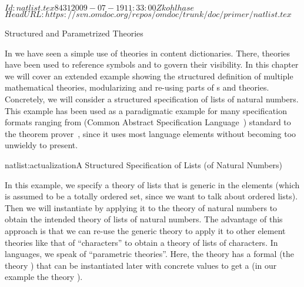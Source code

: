 \svnInfo $Id: natlist.tex 8431 2009-07-19 11:33:00Z kohlhase $
\svnKeyword $HeadURL: https://svn.omdoc.org/repos/omdoc/trunk/doc/primer/natlist.tex $

\begin{omgroup}[id=natlist]{Structured and Parametrized Theories}

In {} we have seen a simple use of theories in {\openmath} content
dictionaries. There, theories have been used to reference {\openmath} symbols and to
govern their visibility. In this chapter we will cover an extended example showing the
structured definition of multiple mathematical theories, modularizing and re-using parts
of {s} and theories.  Concretely, we will consider a
structured specification of lists of natural numbers. This example has been used as a
paradigmatic example for many specification formats ranging from {\casl} (Common Abstract
Specification Language~\cite{CoFI:2004:CASL-RM}) standard to the {\pvs} theorem prover~\cite{OwRu92},
since it uses most language elements without becoming too unwieldy to present.

\begin{myfig}{natlist:actualization}{A Structured Specification of Lists (of
    Natural Numbers)}
\end{myfig}

In this example, we specify a theory {} of lists that is generic in the
elements (which is assumed to be a totally ordered set, since we want to talk about
ordered lists).  Then we will instantiate {} by applying it to the theory
{} of natural numbers to obtain the intended theory {}
of lists of natural numbers.  The advantage of this approach is that we can re-use the
generic theory {} to apply it to other element theories like that of
``characters'' to obtain a theory of lists of characters.  In
{} languages, we speak of ``parametric theories''.
Here, the theory {} has a formal {} (the theory
{}) that can be instantiated later with concrete values to get a
{} (in our example the theory {}).


\end{omgroup}
